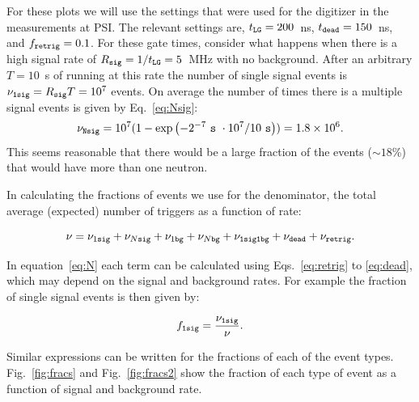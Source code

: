\documentclass[twocolumn]{bmcart}
\begin{document}
\begin{backmatter}
For these plots we will use the settings that were used for the
digitizer in the measurements at PSI.  The relevant settings are,
$t_{\tt LG}=200$~ns, $t_{\tt dead}=150$~ns, and $f_{\tt retrig}=0.1$.
For these gate times, consider what happens when there is a high
signal rate of $R_{\tt sig} = 1/t_{\tt LG} = 5$~MHz with no
background.  After an arbitrary $T=10$~s of running at this rate the
number of single signal events is $\nu_{\tt 1 sig} = R_{\tt sig} T =
10^7$ events.  On average the number of times there is a multiple
signal events is given by Eq.~\ref{eq:Nsig}:
\begin{equation}
\nu_{\tt N sig} = 10^7 ( 1 - \exp{ \left( -2^{-7}\ {\tt s}\ \cdot 10^7  / 10\ {\tt s} \right) } ) = 1.8\times10^6. 
\end{equation}
This seems reasonable that there would be a large fraction of the
events ($\sim 18$\%) that would have more than one neutron.

In calculating the fractions of events we use for the denominator, the
total average (expected) number of triggers as a function of rate:

\begin{equation}\label{eq:N}
\nu = \nu_{1\tt sig} + \nu_{N\tt sig} + \nu_{1\tt bg} + \nu_{N\tt bg} + \nu_{\tt 1 sig 1 bg} + \nu_{\tt dead} + \nu_{\tt retrig}.
\end{equation}

In equation~\ref{eq:N} each term can be calculated using
Eqs.~\ref{eq:retrig} to \ref{eq:dead}, which may depend on the signal
and background rates.  For example the fraction of single signal
events is then given by:

\begin{equation}
f_{\tt 1 sig } = \frac{ \nu_{\tt 1 sig} }{ \nu }.
\end{equation}

Similar expressions can be written for the fractions of each of the
event types.  Fig.~\ref{fig:fracs} and Fig.~\ref{fig:fracs2} show the
fraction of each type of event as a function of signal and background
rate.


\end{backmatter}
\end{document}
